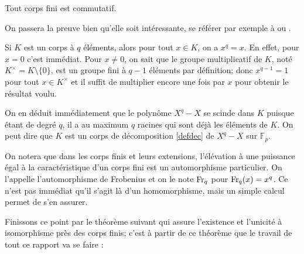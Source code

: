 \documentclass[a4paper]{article} %
\numberwithin{section}{part}
\numberwithin{equation}{section}
\newcommand\GF[1]{\mathbb{F}_{#1}}
\begin{document}
\begin{thm}[Wedderburn]
Tout corps fini est commutatif.
\end{thm}
On passera la preuve bien qu'elle soit intéressante, se référer par exemple à 
\cite[p.~70-73]{LiNi1} ou \cite[p.~82]{Per}.\par
\vspace{0.3cm}
Si $K$ est un corps à $q$ éléments, alors pour tout $x\in K$, on a $x^q = x$. En
effet, pour $x = 0$ c'est immédiat. Pour $x\neq 0$, on sait que le groupe
multiplicatif de $K$, noté $K^{\times} = K\setminus\lbrace0\rbrace$, est un
groupe fini à $q-1$ éléments par définition; donc $x^{q-1} = 1$ pour tout $x\in
K^{\times}$ et il suffit de multiplier encore une fois par $x$ pour obtenir le
résultat voulu.\par
On en déduit immédiatement que le polynôme $X^q - X$ se scinde dans $K$
puisque étant de degré $q$, il a au maximum $q$ racines qui sont déjà les
éléments de $K$. On peut dire que $K$ est un corps de décomposition
\ref{defdec} de $X^q - X$ sur $\GF{p}$.\par
On notera que dans les corps finis et leurs extensions, l'élévation à une
puissance égal à la caractéristique d'un corps fini est un automorphisme 
particulier. On l'appelle l'automorphisme de Frobenius et on le note 
$\textup{Fr}_q$ pour $\textup{Fr}_q(x) = x^q$. Ce n'est pas immédiat qu'il 
s'agit là d'un homomorphisme, mais un simple calcul permet de s'en assurer.\par
\vspace{0.3cm}
Finissons ce point par le théorème suivant qui assure l'existence et l'unicité
à isomorphisme près des corps finis; c'est à partir de ce théorème que le
travail de tout ce rapport va se faire :
\end{document}
